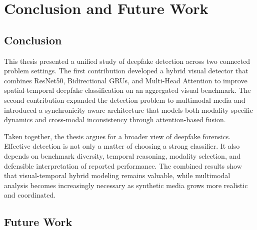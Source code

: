 \chapter{Conclusion and Future Work}
\label{chap:conclusion-future}

\section{Conclusion}

This thesis presented a unified study of deepfake detection across two connected problem settings. The first contribution developed a hybrid visual detector that combines ResNet50, Bidirectional GRUs, and Multi-Head Attention to improve spatial-temporal deepfake classification on an aggregated visual benchmark. The second contribution expanded the detection problem to multimodal media and introduced a synchronicity-aware architecture that models both modality-specific dynamics and cross-modal inconsistency through attention-based fusion.

Taken together, the thesis argues for a broader view of deepfake forensics. Effective detection is not only a matter of choosing a strong classifier. It also depends on benchmark diversity, temporal reasoning, modality selection, and defensible interpretation of reported performance. The combined results show that visual-temporal hybrid modeling remains valuable, while multimodal analysis becomes increasingly necessary as synthetic media grows more realistic and coordinated.

\section{Future Work}

